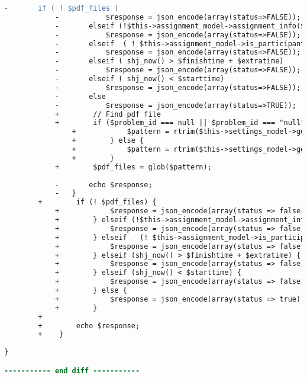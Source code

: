 \begin{lstlisting}[language=diff, caption=Perubahan pada kode Assignments.php]
			-		if ( ! $pdf_files )
			-			$response = json_encode(array(status=>FALSE));
			-		elseif (!$this->assignment_model->assignment_info($assignment_id)['open'])
			-			$response = json_encode(array(status=>FALSE));
			-		elseif	( ! $this->assignment_model->is_participant($this->assignment_model->assignment_info($assignment_id)['participants'],$this->user->username) )
			-			$response = json_encode(array(status=>FALSE));
			-		elseif ( shj_now() > $finishtime + $extratime)
			-			$response = json_encode(array(status=>FALSE));
			-		elseif ( shj_now() < $starttime)
			-			$response = json_encode(array(status=>FALSE));
			-		else
			-			$response = json_encode(array(status=>TRUE));
			+        // Find pdf file
			+        if ($problem_id === null || $problem_id === "null") {
				+            $pattern = rtrim($this->settings_model->get_setting('assignments_root'), '/')."/assignment_{$assignment_id}/*.pdf";
				+        } else {
				+            $pattern = rtrim($this->settings_model->get_setting('assignments_root'), '/')."/assignment_{$assignment_id}/p{$problem_id}/*.pdf";
				+        }
			+        $pdf_files = glob($pattern);
			
			-		echo $response;
			-	}
		+        if (! $pdf_files) {
			+            $response = json_encode(array(status => false));
			+        } elseif (!$this->assignment_model->assignment_info($assignment_id)['open']) {
			+            $response = json_encode(array(status => false));
			+        } elseif	(! $this->assignment_model->is_participant($this->assignment_model->assignment_info($assignment_id)['participants'], $this->user->username)) {
			+            $response = json_encode(array(status => false));
			+        } elseif (shj_now() > $finishtime + $extratime) {
			+            $response = json_encode(array(status => false));
			+        } elseif (shj_now() < $starttime) {
			+            $response = json_encode(array(status => false));
			+        } else {
			+            $response = json_encode(array(status => true));
			+        }
		+
		+        echo $response;
		+    }
	
}

----------- end diff -----------
\end{lstlisting}

